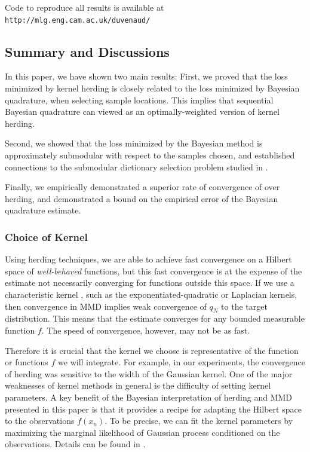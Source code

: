 Code to reproduce all results is available at \texttt{http://mlg.eng.cam.ac.uk/duvenaud/}

\subsection{Summary and Discussions}

In this paper, we have shown two main results:  First, we proved that the loss minimized by kernel herding is closely related to the loss minimized by Bayesian quadrature, when selecting sample locations. This implies that sequential Bayesian quadrature can viewed as an optimally-weighted version of kernel herding.

Second, we showed that the loss minimized by the Bayesian method is approximately submodular with respect to the samples chosen, and established connections to the submodular dictionary selection problem studied in \citep{KrauseCevher10}.

Finally, we empirically demonstrated a superior rate of convergence of \sbq{} over herding, and demonstrated a bound on the empirical error of the Bayesian quadrature estimate.

\subsubsection{Choice of Kernel}

Using herding techniques, we are able to achieve fast convergence on a Hilbert space of \emph{well-behaved} functions, but this fast convergence is at the expense of the estimate not necessarily converging for functions outside this space.
If we use a characteristic kernel \citep{Sriperumbudur2008}, such as the exponentiated-quadratic or Laplacian kernels, then convergence in MMD implies weak convergence of $q_N$ to the target distribution. 
This means that the estimate converges for any bounded measurable function $f$. The speed of convergence, however, may not be as fast.

Therefore it is crucial that the kernel we choose is representative of the function or functions $f$ we will integrate.  For example, in our experiments, the convergence of herding was sensitive to the width of the Gaussian kernel.  One of the major weaknesses of kernel methods in general is the difficulty of setting kernel parameters.  A key benefit of the Bayesian interpretation of herding and MMD presented in this paper is that it provides a recipe for adapting the Hilbert space to the observations $f(x_n)$.  To be precise, we can fit the kernel parameters by maximizing the marginal likelihood of Gaussian process conditioned on the observations.  Details can be found in \citep{rasmussen38gaussian}.

